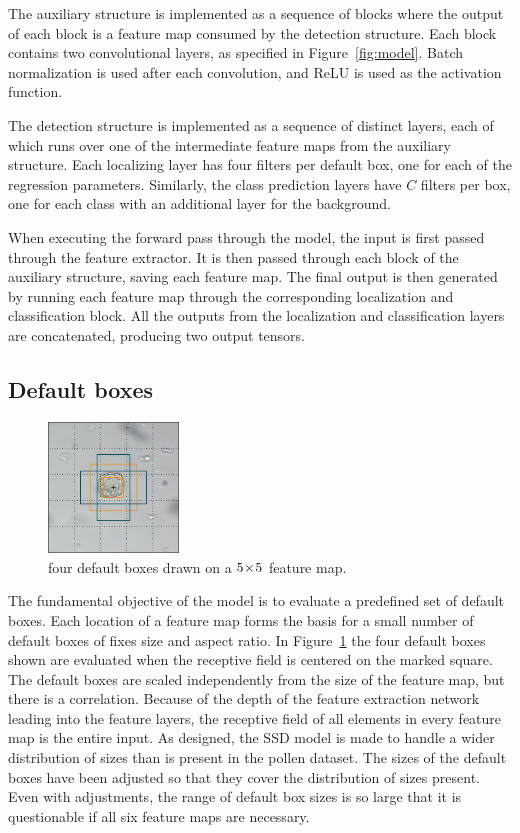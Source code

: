 The auxiliary structure is implemented as a sequence of blocks where the output of each block is a feature map consumed by the detection structure.
Each block contains two convolutional layers, as specified in Figure~\ref{fig:model}.
Batch normalization is used after each convolution, and ReLU is used as the activation function.

The detection structure is implemented as a sequence of distinct layers, each of which runs over one of the intermediate feature maps from the auxiliary structure.
Each localizing layer has four filters per default box, one for each of the regression parameters.
Similarly, the class prediction layers have \(C\) filters per box, one for each class with an additional layer for the background.

When executing the forward pass through the model, the input is first passed through the feature extractor. It is then passed through each block of the auxiliary structure, saving each feature map.
The final output is then generated by running each feature map through the corresponding localization and classification block.
All the outputs from the localization and classification layers are concatenated, producing two output tensors.

\subsection{Default boxes}

\begin{figure}
  \centering
  \includegraphics[width=0.31\textwidth]{figs/method/default_boxes.png}
  \caption[Visualizing default boxes]{four default boxes drawn on a \(5\!\times \! 5 \) feature map.}\label{fig:defaults}
\end{figure}

The fundamental objective of the model is to evaluate a predefined set of default boxes.
Each location of a feature map forms the basis for a small number of default boxes of fixes size and aspect ratio.
In Figure~\ref{fig:defaults} the four default boxes shown are evaluated when the receptive field is centered on the marked square.
The default boxes are scaled independently from the size of the feature map, but there is a correlation.
Because of the depth of the feature extraction network leading into the feature layers, the receptive field of all elements in every feature map is the entire input. As designed, the SSD model is made to handle a wider distribution of sizes than is present in the pollen dataset.
The sizes of the default boxes have been adjusted so that they cover the distribution of sizes present.
Even with adjustments, the range of default box sizes is so large that it is questionable if all six feature maps are necessary.

